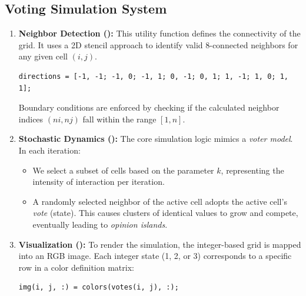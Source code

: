 \documentclass[12pt]{article}
\begin{document}
	 \subsection{Voting Simulation System}

	 \begin{enumerate}
	 	\item \textbf{Neighbor Detection ():}
	 	This utility function defines the connectivity of the grid. It uses a 2D stencil approach to identify valid 8-connected neighbors for any given cell $(i, j)$.
	 	\begin{lstlisting}
directions = [-1, -1; -1, 0; -1, 1; 0, -1; 0, 1; 1, -1; 1, 0; 1, 1];
	 	\end{lstlisting}
	 	Boundary conditions are enforced by checking if the calculated neighbor indices $(ni, nj)$ fall within the range $[1, n]$.
	 	
	 	\item \textbf{Stochastic Dynamics ():}
	 	The core simulation logic mimics a \textit{voter model}. In each iteration:
	 	\begin{itemize}
	 		\item We select a subset of cells based on the parameter $k$, representing the intensity of interaction per iteration.
	 		\item A randomly selected neighbor of the active cell adopts the active cell's \textit{vote} (state). 
	 		This causes clusters of identical values to grow and compete, eventually leading to \textit{opinion islands}.
	 	\end{itemize}
	 	
	 	\item \textbf{Visualization ():}
	 	To render the simulation, the integer-based  grid is mapped into an RGB image. Each integer state (1, 2, or 3) corresponds to a specific row in a color definition matrix:
	 	\begin{lstlisting}
img(i, j, :) = colors(votes(i, j), :);
	 	\end{lstlisting}
	 \end{enumerate}
	 
\end{document}
